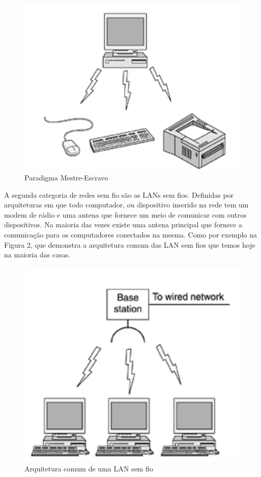 \documentclass[12pt, %
openright, 
oneside,
a4paper,
brazil]{facom-ufu-abntex2}
\begin{document}
\begin{figure}[hbt]
  \includegraphics[scale=0.9]{bt}
  \caption{Paradigma Mestre-Escravo \cite{tanenbaum2003redes}}
\end{figure}

A segunda categoria de redes sem fio são as LANs sem fios. Definidas por arquiteturas em que todo computador, ou dispositivo inserido na rede tem um modem de rádio e uma antena que fornece um meio de comunicar com outros dispositivos. Na maioria das vezes existe uma antena principal que fornece a comunicação para os computadores conectados na mesma. Como por exemplo na Figura 2, que demonstra a arquitetura comum das \ac{LAN} sem fios que temos hoje na maioria das casas.

\begin{figure}[hbt]
  \includegraphics[scale=0.9]{lan} 
  \caption{Arquitetura comum de uma \ac{LAN} sem fio \cite{tanenbaum2003redes}}
\end{figure}
\end{document}
